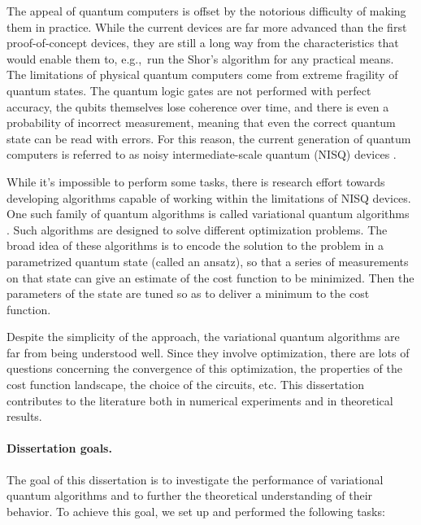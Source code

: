 The appeal of quantum computers is offset by the notorious difficulty of making them in practice. While the current devices are far more advanced than the first proof-of-concept devices, they are still a long way from the characteristics that would enable them to, e.g.,~run the Shor's algorithm for any practical means. 
The limitations of physical quantum computers come from extreme fragility of quantum states. The quantum logic gates are not performed with perfect accuracy, the qubits themselves lose coherence over time, and there is even a probability of incorrect measurement, meaning that even the correct quantum state can be read with errors. For this reason, the current generation of quantum computers is referred to as noisy intermediate-scale quantum (NISQ) devices \cite{bharti_noisy_2021}.

While it's impossible to perform some tasks, there is research effort towards developing algorithms capable of working within the limitations of NISQ devices. One such family of quantum algorithms is called variational quantum algorithms \cite{cerezo_variational_2020}. Such algorithms are designed to solve different optimization problems. The broad idea of these algorithms is to encode the solution to the problem in a parametrized quantum state (called an ansatz), so that a series of measurements on that state can give an estimate of the cost function to be minimized. Then the parameters of the state are tuned so as to deliver a minimum to the cost function. 

Despite the simplicity of the approach, the variational quantum algorithms are far from being understood well. Since they involve optimization, there are lots of questions concerning the convergence of this optimization, the properties of the cost function landscape, the choice of the circuits, etc. This dissertation contributes to the literature both in numerical experiments and in theoretical results.

\paragraph{Dissertation goals.} The goal of this dissertation is to investigate the performance of variational quantum algorithms and to further the theoretical understanding of their behavior. To achieve this goal, we set up and performed the following tasks:

